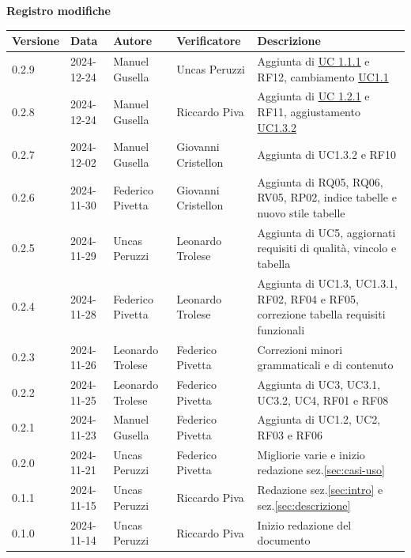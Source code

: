 \documentclass[11pt]{article}
\begin{document}
\centering\textbf{Registro modifiche}\\
\vspace{2mm}
\begin{tabularx}{\textwidth}{|l|l|l|l|X|}
\hline
\textbf{Versione} & \textbf{Data} & \textbf{Autore} & \textbf{Verificatore} & \textbf{Descrizione} \\
\hline
0.2.9 & 2024-12-24 & Manuel Gusella & Uncas Peruzzi & Aggiunta di \hyperref[UC1.1.1]{UC 1.1.1} e RF12, cambiamento \hyperref[UC1.1]{UC1.1} \\
\hline
0.2.8 & 2024-12-24 & Manuel Gusella & Riccardo Piva & Aggiunta di \hyperref[UC1.2.1]{UC 1.2.1} e RF11, aggiustamento \hyperref[UC1.3.2]{UC1.3.2} \\
\hline
0.2.7 & 2024-12-02 & Manuel Gusella & Giovanni Cristellon & Aggiunta di UC1.3.2 e RF10 \\
\hline
0.2.6 & 2024-11-30 & Federico Pivetta & Giovanni Cristellon & Aggiunta di RQ05, RQ06, RV05, RP02, indice tabelle e nuovo stile tabelle \\
\hline
0.2.5 & 2024-11-29 & Uncas Peruzzi & Leonardo Trolese & Aggiunta di UC5, aggiornati requisiti di qualità, vincolo e tabella \\
\hline
0.2.4 & 2024-11-28 & Federico Pivetta & Leonardo Trolese & Aggiunta di UC1.3, UC1.3.1, RF02, RF04 e RF05, correzione tabella requisiti funzionali \\
\hline
0.2.3 & 2024-11-26 & Leonardo Trolese  & Federico Pivetta & Correzioni minori grammaticali e di contenuto \\
\hline
0.2.2 & 2024-11-25 & Leonardo Trolese  & Federico Pivetta & Aggiunta di UC3, UC3.1, UC3.2, UC4, RF01 e RF08 \\
\hline
0.2.1 & 2024-11-23 & Manuel Gusella  & Federico Pivetta & Aggiunta di UC1.2, UC2, RF03 e RF06\\
\hline
0.2.0 & 2024-11-21 & Uncas Peruzzi  & Federico Pivetta & Migliorie varie e inizio redazione sez.\ref{sec:casi-uso} \\
\hline
0.1.1 & 2024-11-15 & Uncas Peruzzi  & Riccardo Piva & Redazione sez.\ref{sec:intro} e sez.\ref{sec:descrizione} \\
\hline
0.1.0 & 2024-11-14 & Uncas Peruzzi  & Riccardo Piva & Inizio redazione del documento\\
\hline
\end{tabularx}

\newpage
\tableofcontents
\newpage
\listoffigures
\newpage
\listoftables
\end{document}
